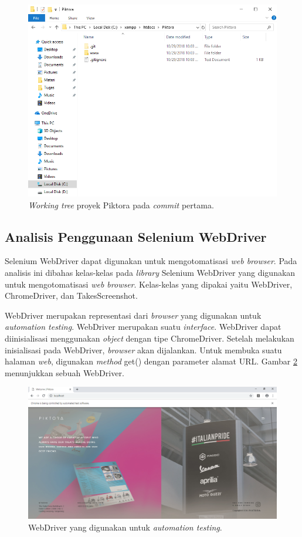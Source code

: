\begin{figure}[H]
	\centering
		\includegraphics[scale=0.6]{Gambar/piktora_first_commit.png}
	\caption{\textit{Working tree} proyek Piktora pada \textit{commit} pertama.}
	\label{fig:piktora_first_wt}
\end{figure}

\subsection{Analisis Penggunaan Selenium WebDriver}
\label{subsec:analisis_selenium}
Selenium WebDriver dapat digunakan untuk mengotomatisasi \textit{web browser}. Pada analisis ini dibahas kelas-kelas pada \textit{library} Selenium WebDriver yang digunakan untuk mengotomatisasi \textit{web browser}. 
Kelas-kelas yang dipakai yaitu WebDriver, ChromeDriver, dan TakesScreenshot.


WebDriver merupakan representasi dari \textit{browser} yang digunakan untuk \textit{automation testing}. WebDriver merupakan suatu \textit{interface}. WebDriver dapat diinisialisasi menggunakan \textit{object} dengan tipe ChromeDriver. Setelah melakukan inisialisasi pada WebDriver, \textit{browser} akan dijalankan. Untuk membuka suatu halaman \textit{web}, digunakan \textit{method} get() dengan parameter alamat URL. Gambar \ref{fig:webdriver} menunjukkan sebuah WebDriver. 

\begin{figure}[H]
	\centering
		\includegraphics[scale=0.5]{Gambar/ChromeDriver.png}
	\caption{WebDriver yang digunakan untuk \textit{automation testing}.}
	\label{fig:webdriver}
\end{figure}


